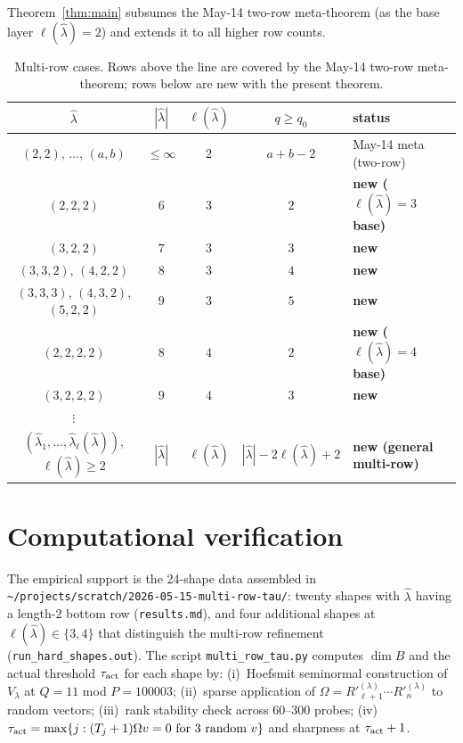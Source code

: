 \documentclass[11pt]{article}
\theoremstyle{definition}
\newcommand{\Vlam}{V_\lambda}
\newcommand{\Om}{\Omega}
\newcommand{\hatl}{\widehat\lambda}
\newcommand{\Rp}{{R'}}
\newcommand{\elh}{\ell(\hatl)}
\begin{document}
Theorem~\ref{thm:main} subsumes the May-14 two-row meta-theorem
(as the base layer $\elh = 2$) and extends it to all higher row counts.

\begin{table}[h]
\centering
\renewcommand{\arraystretch}{1.15}
\caption{Multi-row cases.  Rows above the line are
covered by the May-14 two-row meta-theorem; rows below are new with
the present theorem.}
\begin{tabular}{c|c|c|c|l}
\toprule
$\hatl$ & $|\hatl|$ & $\elh$ & $q \ge q_0$ & status \\
\midrule
$(2,2)$, $\ldots$, $(a, b)$ & $\le \infty$ & $2$ & $a + b - 2$ &
  May-14 meta (two-row) \\
\midrule
$(2, 2, 2)$ & $6$ & $3$ & $2$ & \textbf{new ($\elh = 3$ base)} \\
$(3, 2, 2)$ & $7$ & $3$ & $3$ & \textbf{new} \\
$(3, 3, 2)$, $(4, 2, 2)$ & $8$ & $3$ & $4$ & \textbf{new} \\
$(3, 3, 3)$, $(4, 3, 2)$, $(5, 2, 2)$ & $9$ & $3$ & $5$ & \textbf{new} \\
$(2, 2, 2, 2)$ & $8$ & $4$ & $2$ & \textbf{new ($\elh = 4$ base)} \\
$(3, 2, 2, 2)$ & $9$ & $4$ & $3$ & \textbf{new} \\
$\vdots$ & & & & \\
$(\hatl_1, \ldots, \hatl_\elh)$, $\elh \ge 2$ & $|\hatl|$ & $\elh$ &
  $|\hatl| - 2\elh + 2$ & \textbf{new (general multi-row)} \\
\bottomrule
\end{tabular}
\end{table}

\section{Computational verification}\label{sec:verify}

The empirical support is the 24-shape data assembled in
\texttt{\textasciitilde/projects/scratch/2026-05-15-multi-row-tau/}:
twenty shapes with $\hatl$ having a length-$2$ bottom row
(\texttt{results.md}), and four additional shapes at $\elh \in \{3, 4\}$
that distinguish the multi-row refinement (\texttt{run\_hard\_shapes.out}).
The script \texttt{multi\_row\_tau.py} computes
$\dim B$ and the actual threshold $\tau_{\rm act}$ for each shape by:
(i)~Hoefsmit seminormal construction of $\Vlam$ at $Q = 11$ mod
$P = 100003$; (ii)~sparse application of $\Om = \Rp_{\ell+1}^{(\lambda)}
\cdots \Rp_n^{(\lambda)}$ to random vectors; (iii)~rank stability check
across 60--300 probes; (iv)~$\tau_{\rm act} = \max\{j : (T_j+1)\Om v = 0
\text{ for 3 random } v\}$ and sharpness at $\tau_{\rm act}+1$.
\end{document}
